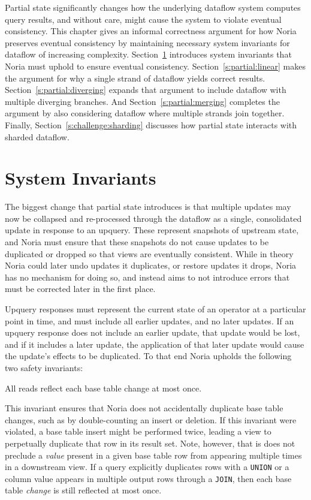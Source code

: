 Partial state significantly changes how the underlying dataflow system computes
query results, and without care, might cause the system to violate eventual
consistency. This chapter gives an informal correctness argument for how Noria
preserves eventual consistency by maintaining necessary system invariants for
dataflow of increasing complexity. Section~\ref{s:invariants} introduces system
invariants that Noria must uphold to ensure eventual consistency.
Section~\ref{s:partial:linear} makes the argument for why a single strand of
dataflow yields correct results. Section~\ref{s:partial:diverging} expands that
argument to include dataflow with multiple diverging branches. And
Section~\ref{s:partial:merging} completes the argument by also considering
dataflow where multiple strands join together. Finally,
Section~\ref{s:challenge:sharding} discusses how partial state interacts with
sharded dataflow.

\section{System Invariants}
\label{s:invariants}

The biggest change that partial state introduces is that multiple updates may
now be collapsed and re-processed through the dataflow as a single, consolidated
update in response to an upquery. These represent snapshots of upstream state,
and Noria must ensure that these snapshots do not cause updates to be duplicated
or dropped so that views are eventually consistent. While in theory Noria could
later undo updates it duplicates, or restore updates it drops, Noria has no
mechanism for doing so, and instead aims to not introduce errors that must be
corrected later in the first place.

Upquery responses must represent the current state of an operator at a
particular point in time, and must include all earlier updates, and no later
updates. If an upquery response does not include an earlier update, that update
would be lost, and if it includes a later update, the application of that later
update would cause the update's effects to be duplicated. To that end
Noria upholds the following two safety invariants:

\begin{invariant}
  \label{i:no-spurious}
  All reads reflect each base table change at most once.
\end{invariant}

This invariant ensures that Noria does not accidentally duplicate base table
changes, such as by double-counting an insert or deletion. If this invariant
were violated, a base table insert might be performed twice, leading a view to
perpetually duplicate that row in its result set. Note, however, that is does
not preclude a \emph{value} present in a given base table row from appearing
multiple times in a downstream view. If a query explicitly duplicates
rows with a \texttt{UNION} or a column value appears in multiple output rows
through a \texttt{JOIN}, then each base table \emph{change} is still reflected
at most once.


